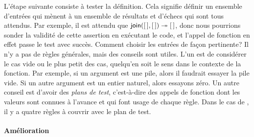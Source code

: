 L'étape suivante consiste à tester la définition. Cela signifie
définir un ensemble d'entrées qui mènent à un ensemble de résultats et
d'échecs qui sont tous attendus. Par exemple, il est attendu que
\(\textsf{join}([\,],[\,]) \twoheadrightarrow [\,]\), donc nous pourrions
sonder la validité de cette assertion en exécutant le code, et l'appel
de fonction en effet passe le test avec succès. Comment choisir les
entrées de façon pertinente? Il n'y a pas de règles générales, mais
des conseils sont utiles. L'un est de considérer le cas vide ou le
plus petit des cas, quelqu'en soit le sens dans le contexte de la
fonction. Par exemple, si un argument est une pile, alors il faudrait
essayer la pile vide. Si un autre argument est un entier naturel,
alors essayons zéro. Un autre conseil est d'avoir des \emph{plans de
  test}, c'est-à-dire des appels de fonction dont les valeurs sont
connues à l'avance et qui font usage de chaque règle. Dans le cas de
, il y a quatre règles à couvrir avec le plan de test.
 

\paragraph{Amélioration}

